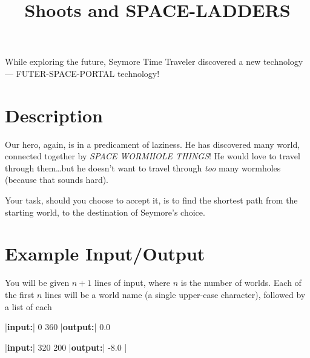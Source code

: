 \documentclass{../codeproblem}
\begin{document}
\title{Shoots and SPACE-LADDERS}

\begin{flavor}
  While exploring the future, Seymore Time Traveler discovered a new
  technology --- FUTER-SPACE-PORTAL technology!
\end{flavor}

\section*{Description}
Our hero, again, is in a predicament of laziness. He has discovered
many world, connected together by \emph{SPACE WORMHOLE THINGS}! He
would love to travel through them\ldots but he doesn't want to travel
through \emph{too} many wormholes (because that sounds hard).

Your task, should you choose to accept it, is to find the shortest
path from the starting world, to the destination of Seymore's choice.

\section*{Example Input/Output}

You will be given $n+1$ lines of input, where $n$ is the number of
worlds. Each of the first $n$ lines will be a world name (a single
upper-case character), followed by a list of each 

\begin{example}
|\textbf{input:}| 0 360
|\textbf{output:}| 0.0

|\textbf{input:}| 320 200
|\textbf{output:}| -8.0
|\end{example}
\end{document}

